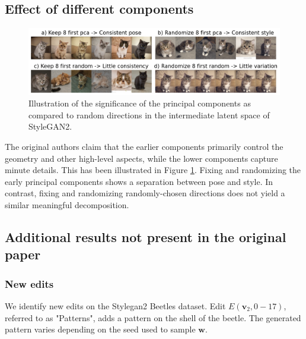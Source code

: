 \subsection{Effect of different components}

\begin{figure}[H]
    \centering
    \includegraphics[width=\textwidth]{figs/figure4_randomize_8_first_random-little_variation.png}
    \caption{Illustration of the significance of the principal components as compared to random directions in the intermediate latent space of StyleGAN2.}
    \label{fig:cats}
\end{figure}

The original authors claim that the earlier components primarily control the geometry and other high-level aspects, while the lower components capture minute details. This has been illustrated in Figure \ref{fig:cats}. Fixing and randomizing the early principal components shows a separation between pose and style. In contrast, fixing and randomizing randomly-chosen directions does not yield a similar meaningful decomposition.

\subsection{Additional results not present in the original paper}

\subsubsection{New edits}

We identify new edits on the Stylegan2 Beetles dataset. Edit $E(\textbf{v}_{2}, 0-17)$, referred to as "Patterns", adds a pattern on the shell of the beetle. The generated pattern varies depending on the seed used to sample $\textbf{w}$.

